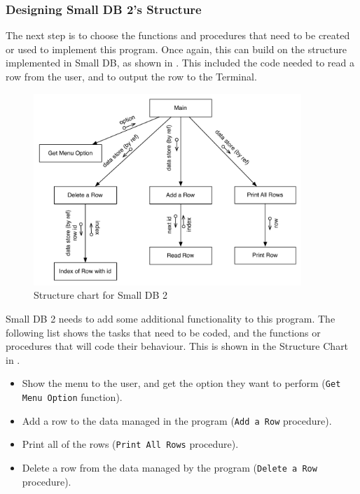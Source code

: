 
\subsubsection{Designing Small DB 2's Structure} %
\label{ssub:designing_small_db_2_s_structure}

The next step is to choose the functions and procedures that need to be created or used to implement this program. Once again, this can build on the structure implemented in Small DB, as shown in . This included the code needed to read a row from the user, and to output the row to the Terminal.

\begin{figure}[p]
   \centering
   \includegraphics[width=0.90\textwidth]{./topics/dynamic-memory/diagrams/SmallDB2Structure} 
   \caption{Structure chart for Small DB 2}
   \label{fig:small-db-2-struct}
\end{figure}

Small DB 2 needs to add some additional functionality to this program. The following list shows the tasks that need to be coded, and the functions or procedures that will code their behaviour. This is shown in the Structure Chart in .

\begin{itemize}
  \item Show the menu to the user, and get the option they want to perform (\texttt{Get Menu Option} function).
  \item Add a row to the data managed in the program (\texttt{Add a Row} procedure).
  \item Print all of the rows (\texttt{Print All Rows} procedure).
  \item Delete a row from the data managed by the program (\texttt{Delete a Row} procedure).
\end{itemize}

